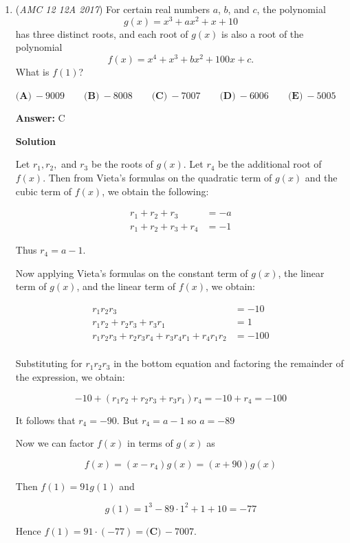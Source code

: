 \begin{enumerate}
 


	\item (\textit{AMC 12 12A 2017}) For certain real numbers $a$, $b$, and $c$, the polynomial 
 \[g(x) = x^3 + ax^2 + x + 10\]has three distinct roots, and each root of $g(x)$ is also a root of the polynomial 
 \[f(x) = x^4 + x^3 + bx^2 + 100x + c.\]What is $f(1)$?


 $\textbf{(A)}\ -9009 \qquad\textbf{(B)}\ -8008 \qquad\textbf{(C)}\ -7007 \qquad\textbf{(D)}\ -6006 \qquad\textbf{(E)}\ -5005$

 \textbf{Answer: }C



\textbf{Solution}

Let $r_1,r_2,$ and $r_3$ be the roots of $g(x)$. Let $r_4$ be the additional root of $f(x)$. Then from Vieta's formulas on the quadratic term of $g(x)$ and the cubic term of $f(x)$, we obtain the following:

 
 \begin{align*} r_1+r_2+r_3&=-a \\  r_1+r_2+r_3+r_4&=-1 \end{align*}


 Thus $r_4=a-1$.

 Now applying Vieta's formulas on the constant term of $g(x)$, the linear term of $g(x)$, and the linear term of $f(x)$, we obtain:

 
 \begin{align*} r_1r_2r_3  & = -10\\ r_1r_2+r_2r_3+r_3r_1 &= 1\\  r_1r_2r_3+r_2r_3r_4+r_3r_4r_1+r_4r_1r_2  & = -100\\ \end{align*}


 Substituting for $r_1r_2r_3$ in the bottom equation and factoring the remainder of the expression, we obtain:

 
 \[-10+(r_1r_2+r_2r_3+r_3r_1)r_4=-10+r_4=-100\]

 It follows that $r_4=-90$. But $r_4=a-1$ so $a=-89$

 Now we can factor $f(x)$ in terms of $g(x)$ as

 
 \[f(x)=(x-r_4)g(x)=(x+90)g(x)\]

 Then $f(1)=91g(1)$ and

 
 \[g(1)=1^3-89\cdot 1^2+1+10=-77\]

 Hence $f(1)=91\cdot(-77)=\boxed{\textbf{(C)}\,-7007}$.

 




\end{enumerate}
